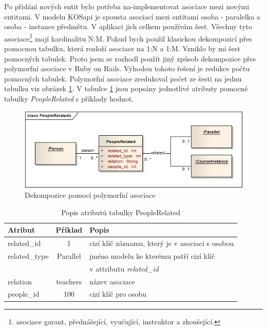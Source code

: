 Po přidání nových entit bylo potřeba na-implementovat asociace mezi novými entitami. V modelu KOSapi je spousta asociací mezi entitami osoba - paralelka a osoba - instance předmětu. V aplikaci jich celkem používám šest. Všechny tyto asociace\footnote{asociace garant, přednášející, vyučující, instruktor a zkoušející.} mají kardinalitu N:M. Pokud bych použil klasickou dekompozicí přes pomocnou tabulku, která rozloží asociace na 1:N a 1:M. Vzniklo by mi šest pomocných tabulek. Proto jsem se rozhodl použít jiný způsob dekompozice přes polymorfní asociace \cite{guide_pa} v Ruby on Rails. Výhodou tohoto řešení je redukce počtu pomocných tabulek. Polymorfní asociace zredukoval počet ze šesti na jednu tabulku viz obrázek \ref{fig:polymorfni}. V tabulce \ref{tab:people_related} jsou popsány jednotlivé atributy pomocné tabulky \textit{PeopleRelated} s příklady hodnot.

\begin{figure}[h]
\begin{center}
\includegraphics[width=12cm]{figures/PeopleRelateds}
\caption{Dekompozice pomocí polymorfní asociace}
\label{fig:polymorfni}
\end{center}
\end{figure}

\begin{table}[h]
\begin{center}
\begin{tabular}{|l|c|l|}

\hline
\textbf{Atribut} & \textbf{Příklad} & \textbf{Popis} \\ \hline
related\_id & 1 & cizí klíč záznamu, který je v asociaci s osobou \\\hline
related\_type & Parallel & jméno modelu ke kterému patří cizí klíč \\ & & v attributu \textit{related\_id} \\ \hline
relation & teachers & název asociace \\\hline
people\_id & 100 & cizí klíč pro osobu  \\\hline

\end{tabular}
\caption{Popis atributů tabulky PeopleRelated}
\label{tab:people_related}
\end{center}
\end{table}


